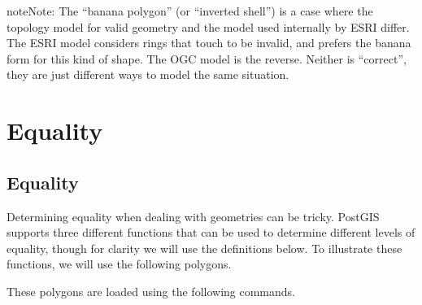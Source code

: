 \documentclass[a4paper,11pt,english]{sphinxmanual}
\begin{document}
\begin{sphinxVerbatim}[commandchars=\\\{\}]
           
\end{sphinxVerbatim}

\begin{sphinxadmonition}{note}{Note:}
The “banana polygon” (or “inverted shell”) is a case where the {\hyperref[\detokenize{glossary:term-ogc}]{}} topology model for valid geometry and the model used internally by ESRI differ. The ESRI model considers rings that touch to be invalid, and prefers the banana form for this kind of shape. The OGC model is the reverse. Neither is “correct”, they are just different ways to model the same situation.
\end{sphinxadmonition}


\section{Equality}
\label{\detokenize{advanced:equality}}\label{\detokenize{advanced:id3}}

\subsection{Equality}
\label{\detokenize{advanced:id4}}
Determining equality when dealing with geometries can be tricky.  PostGIS supports three different functions that can be used to determine different levels of equality, though for clarity we will use the definitions below.  To illustrate these functions, we will use the following polygons.

\noindent{}

These polygons are loaded using the following commands.
\end{document}
